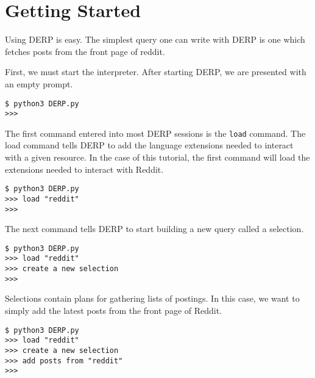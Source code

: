 \section{Getting Started}
Using DERP is easy. The simplest query one can write with DERP is one which fetches posts from the front page of reddit.

First, we must start the interpreter. After starting DERP, we are presented with an empty prompt.
\newline\begin{minipage}{\linewidth}\begin{lstlisting}
$ python3 DERP.py
>>>
\end{lstlisting}\end{minipage}



The first command entered into most DERP sessions is the \texttt{load} command. The load command tells DERP to add the language
extensions needed to interact with a given resource. In the case of this tutorial, the first command will load the
extensions needed to interact with Reddit.
\newline\begin{minipage}{\linewidth}\begin{lstlisting}
$ python3 DERP.py
>>> load "reddit"
>>>
\end{lstlisting}\end{minipage}



The next command tells DERP to start building a new query called a selection.
\newline\begin{minipage}{\linewidth}\begin{lstlisting}
$ python3 DERP.py
>>> load "reddit"
>>> create a new selection
>>>
\end{lstlisting}\end{minipage}



Selections contain plans for gathering lists of postings. In this case, we want to simply add the latest posts from the front page of Reddit.
\newline\begin{minipage}{\linewidth}\begin{lstlisting}
$ python3 DERP.py
>>> load "reddit"
>>> create a new selection
>>> add posts from "reddit"
>>>
\end{lstlisting}\end{minipage}



